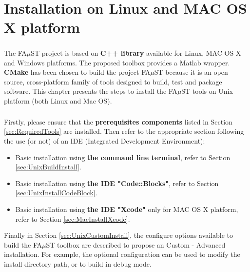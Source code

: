 \chapter{Installation on Linux and MAC OS X platform}\label{sec:InstallUnix}

\paragraph{}The FA$\mu$ST project is based on \textbf{C++ library} available for Linux, MAC OS X and Windows platforms. The proposed toolbox provides a Matlab wrapper. \textbf{CMake} has been chosen to build the project FA$\mu$ST because it is an open-source, cross-platform family of tools designed to build, test and package software. This chapter presents the steps to install the FA$\mu$ST tools on Unix platform (both Linux and Mac OS). 

\paragraph{}Firstly, please ensure that the \textbf{prerequisites components} listed in Section \ref{sec:RequiredTools} are installed. Then refer to the appropriate section following the use (or not) of an IDE (Integrated Development Environment): 
\begin{itemize}
\item Basic installation using \textbf{the command line terminal}, refer to Section \ref{sec:UnixBuildInstall}.
\item Basic installation using \textbf{the IDE "Code::Blocks"}, refer to Section \ref{sec:UnixInstallCodeBlock}. 
\item Basic installation using \textbf{the IDE "Xcode"} only for MAC OS X platform, refer to Section \ref{sec:MacInstallXcode}. 
\end{itemize}

Finally in Section \ref{sec:UnixCustomInstall}, the configure options available to build the FA$\mu$ST toolbox are described to propose an Custom - Advanced installation. For example, the optional configuration can be used to modify the install directory path, or to build in debug mode.  

